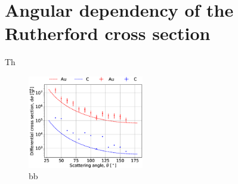 \section{Angular dependency of the Rutherford cross section}
Th
\begin{figure}[h]
	\centering
		\includegraphics[width=0.45\textwidth]{graphics/differential_cross_section.eps}
	\caption{bb}
	\label{fig:Differential_cross_section}
\end{figure}
\newpage
